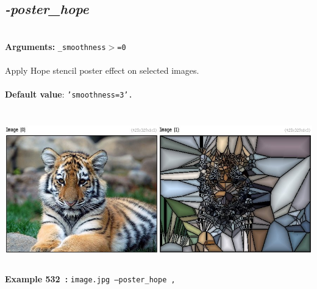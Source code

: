 \documentclass[a4paper,11pt,twoside]{book}
\begin{document}
\subsection{\emph{-poster\_hope} }\vspace*{-0.5em}
~\\\textbf{Arguments: } 
{\small \texttt{\_smoothness$>$=0}}\\~\\
Apply Hope stencil poster effect on selected images.
~\\~\\\textbf{Default value}: {\small \texttt{'smoothness=3'.}}
\begin{center}\includegraphics[keepaspectratio=true,height=7cm,width=\textwidth]{img/gmic_def532.jpg}\\
{\footnotesize \textbf{Example 532~:} \texttt{image.jpg --poster\_hope ,}}
\end{center}
\end{document}
